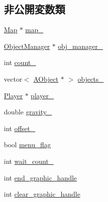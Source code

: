 \subsection*{非公開変数類}
\begin{DoxyCompactItemize}
\item 
\hyperlink{class_map}{Map} $\ast$ \hyperlink{class_field_afa58380f2c246abfac40e368e9a157f0}{map\+\_\+}
\item 
\hyperlink{class_object_manager}{Object\+Manager} $\ast$ \hyperlink{class_field_af51776b9b909f421068a8bcd9701e142}{obj\+\_\+manager\+\_\+}
\item 
int \hyperlink{class_field_a5c4f6af48254c9dcc602879aaf86d03e}{count\+\_\+}
\item 
vector$<$ \hyperlink{class_a_object}{A\+Object} $\ast$ $>$ \hyperlink{class_field_a0e7ed8b2be66267ec1570648f6cdbe40}{objects\+\_\+}
\item 
\hyperlink{class_player}{Player} $\ast$ \hyperlink{class_field_a4376e5c7cac9ae060281c65a9bb10546}{player\+\_\+}
\item 
double \hyperlink{class_field_a3bbc1c73deeb5dc6b2ac78487b121353}{gravity\+\_\+}
\item 
int \hyperlink{class_field_ae160817fea72d1483d556eba3f97dfe6}{offset\+\_\+}
\item 
bool \hyperlink{class_field_a7b31ee36e5115d099c6b7beb47397621}{menu\+\_\+flag}
\item 
int \hyperlink{class_field_a20e399af0fc61f66c5b0a7aadcb5e10b}{wait\+\_\+count\+\_\+}
\item 
int \hyperlink{class_field_ac77b13cecde2f70c728d9a8d4355928e}{end\+\_\+graphic\+\_\+handle}
\item 
int \hyperlink{class_field_a00ee4da146cd30fce7aa9e7ce5b3a781}{clear\+\_\+graphic\+\_\+handle}
\end{DoxyCompactItemize}


